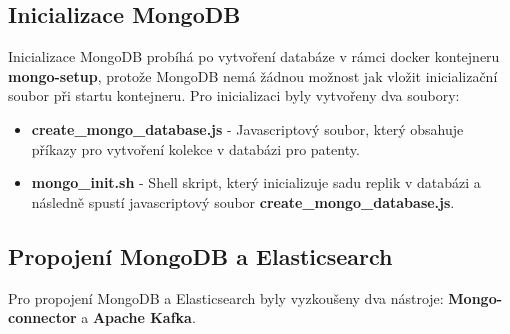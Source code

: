 
\subsection{Inicializace MongoDB}
Inicializace MongoDB probíhá po vytvoření databáze v rámci docker kontejneru \textbf{mongo-setup}, protože MongoDB nemá žádnou možnost jak vložit inicializační soubor při startu kontejneru. Pro inicializaci byly vytvořeny dva soubory:
\begin{itemize}
\item \textbf{create\_mongo\_database.js} - Javascriptový soubor, který obsahuje příkazy pro vytvoření kolekce v databázi pro patenty.
\item \textbf{mongo\_init.sh} - Shell skript, který inicializuje sadu replik v databázi a následně spustí javascriptový soubor \textbf{create\_mongo\_database.js}.
\end{itemize}

%


\subsection{Propojení MongoDB a Elasticsearch}
Pro propojení MongoDB a Elasticsearch byly vyzkoušeny dva nástroje: \textbf{Mongo-connector} a \textbf{Apache Kafka}. 

